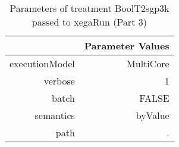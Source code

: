 \begin{table}[ht]
\centering
\begin{tabular}{rr}
  \hline
 & Parameter Values \\ 
  \hline
executionModel & MultiCore \\ 
  verbose & 1 \\ 
  batch & FALSE \\ 
  semantics & byValue \\ 
  path & . \\ 
   \hline
\end{tabular}
\caption{ Parameters of treatment BoolT2sgp3k passed to xegaRun
 (Part 3)} 
\end{table}

